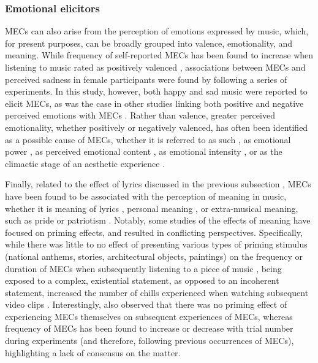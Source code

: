 \subsubsection{Emotional elicitors}

MECs can also arise from the perception of emotions expressed by music, which, for present purposes, can be broadly grouped into valence, emotionality, and meaning. While frequency of self-reported MECs has been found to increase when listening to music rated as positively valenced \parencite{grewe2011}, associations between MECs and perceived sadness in female participants were found by \textcite{panksepp1995} following a series of experiments. In this study, however, both happy and sad music were reported to elicit MECs, as was the case in other studies linking both positive and negative perceived emotions with MECs \parencite{bannister2020a, mori2017}. Rather than valence, greater perceived emotionality, whether positively or negatively valenced, has often been identified as a possible cause of MECs, whether it is referred to as such \parencite{beier2020}, as emotional power \parencite{rickard2004}, as perceived emotional content \parencite{panksepp1995}, as emotional intensity \parencite{bannister2018}, or as the climactic stage of an aesthetic experience \parencite{panzarella1980}.

Finally, related to the effect of lyrics discussed in the previous subsection \parencite{bannister2020a, schurtz2012}, MECs have been found to be associated with the perception of meaning in music, whether it is meaning of lyrics \parencite{bannister2020a}, personal meaning \parencite{craig2009, goldstein1980}, or extra-musical meaning, such as pride or patriotism \parencite{mlejnek2013}. Notably, some studies of the effects of meaning have focused on priming effects, and resulted in conflicting perspectives. Specifically, while there was little to no effect of presenting various types of priming stimulus (national anthems, stories, architectural objects, paintings) on the frequency or duration of MECs when subsequently listening to a piece of music \parencite{konecni2007b}, being exposed to a complex, existential statement, as opposed to an incoherent statement, increased the number of chills experienced when watching subsequent video clips \parencite{schoeller2016, schoeller2018a}. Interestingly, \textcite{konecni2007b} also observed that there was no priming effect of experiencing MECs themselves on subsequent experiences of MECs, whereas frequency of MECs has been found to increase \parencite{benedek2011} or decrease \parencite{laeng2016} with trial number during experiments (and therefore, following previous occurrences of MECs), highlighting a lack of consensus on the matter.

